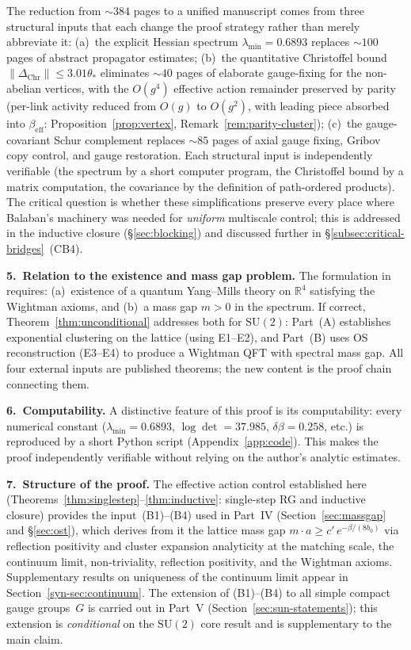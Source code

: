 \documentclass[11pt]{article}
\theoremstyle{definition}
\newcommand{\SU}{\mathrm{SU}}
\newcommand{\R}{\mathbb{R}}
\begin{document}
\noindent The reduction from ${\sim}384$ pages to a unified manuscript
comes from three structural inputs that each change the proof
strategy rather than merely abbreviate it: (a)~the explicit Hessian
spectrum $\lambda_{\min}=0.6893$ replaces ${\sim}100$ pages of abstract
propagator estimates; (b)~the quantitative Christoffel bound
$\|\Delta_{\mathrm{Chr}}\|\le 3.01\theta_*$ eliminates ${\sim}40$ pages
of elaborate gauge-fixing for the non-abelian vertices, with the
$O(g^4)$ effective action remainder preserved by parity
(per-link activity reduced from $O(g)$ to $O(g^2)$,
with leading piece absorbed into $\beta_{\mathrm{eff}}$:
Proposition~\ref{prop:vertex}, Remark~\ref{rem:parity-cluster});
(c)~the gauge-covariant Schur complement replaces ${\sim}85$ pages
of axial gauge fixing, Gribov copy control, and gauge restoration.
Each structural input is independently verifiable (the spectrum by a
short computer program, the Christoffel bound by a matrix computation,
the covariance by the definition of path-ordered products).
The critical question is whether these simplifications
preserve every place where Balaban's machinery was needed for
\emph{uniform} multiscale control; this is addressed in
the inductive closure (\S\ref{sec:blocking}) and discussed
further in \S\ref{subsec:critical-bridges}~(CB4).

\medskip\noindent\textbf{5.~Relation to the existence and mass gap problem.}
The formulation in~\cite{JaffeWitten} requires:
(a)~existence of a quantum Yang--Mills theory on $\R^4$ satisfying the
Wightman axioms, and (b)~a mass gap $m>0$ in the spectrum.
If correct, Theorem~\ref{thm:unconditional} addresses both for $\SU(2)$:
Part~(A) establishes exponential clustering on the lattice
(using E1--E2), and Part~(B) uses OS reconstruction
(E3--E4) to produce a Wightman QFT with spectral mass gap.
All four external inputs are published theorems; the
new content is the proof chain connecting them.

\medskip\noindent\textbf{6.~Computability.}
A distinctive feature of this proof is its computability: every
numerical constant ($\lambda_{\min}=0.6893$, $\log\det=37.985$,
$\delta\beta=0.258$, etc.) is reproduced by a short Python script
(Appendix~\ref{app:code}).  This makes the proof independently
verifiable without relying on the author's analytic estimates.

\medskip\noindent\textbf{7.~Structure of the proof.}
The effective action control established here
(Theorems~\ref{thm:singlestep}--\ref{thm:inductive}: single-step
RG and inductive closure) provides the input~(B1)--(B4) used in
Part~IV (Section~\ref{sec:massgap} and \S\ref{sec:ost}),
which derives from it the
lattice mass gap $m\cdot a\ge c'\,e^{-\beta/(8b_0)}$ via reflection
positivity and cluster expansion analyticity at the matching scale,
the continuum limit, non-triviality, reflection positivity,
and the Wightman axioms.
Supplementary results on uniqueness of the continuum limit
appear in Section~\ref{syn-sec:continuum}.
The extension of (B1)--(B4) to all simple compact gauge
groups~$G$ is carried out in Part~V
(Section~\ref{sec:sun-statements}); this extension is
\emph{conditional} on the $\SU(2)$ core result
and is supplementary to the main claim.
\end{document}
